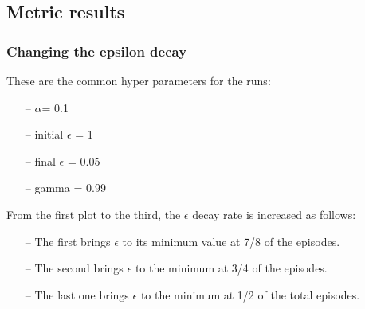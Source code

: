\documentclass{article}
\begin{document}
\subsection{Metric results}


\subsubsection{Changing the epsilon decay}


These are the common hyper parameters for the runs:
\begin{itemize}
\item[--] $\alpha$= 0.1
\item[--] initial $\epsilon$ = 1
\item[--] final $\epsilon$ = 0.05
\item[--] gamma = 0.99
\end{itemize}

From the first plot to the third, the $\epsilon$ decay rate is increased as follows:

\begin{itemize}
\item[--] The first brings $\epsilon$ to its minimum value at 7/8 of the episodes.
\item[--] The second brings $\epsilon$ to the minimum at 3/4 of the episodes.
\item[--] The last one brings $\epsilon$ to the minimum at 1/2 of the total episodes.
\end{itemize}


\begin{center}
\centering
{}
\end{center}

\begin{center}
\centering
{}
\end{center}
\end{document}
